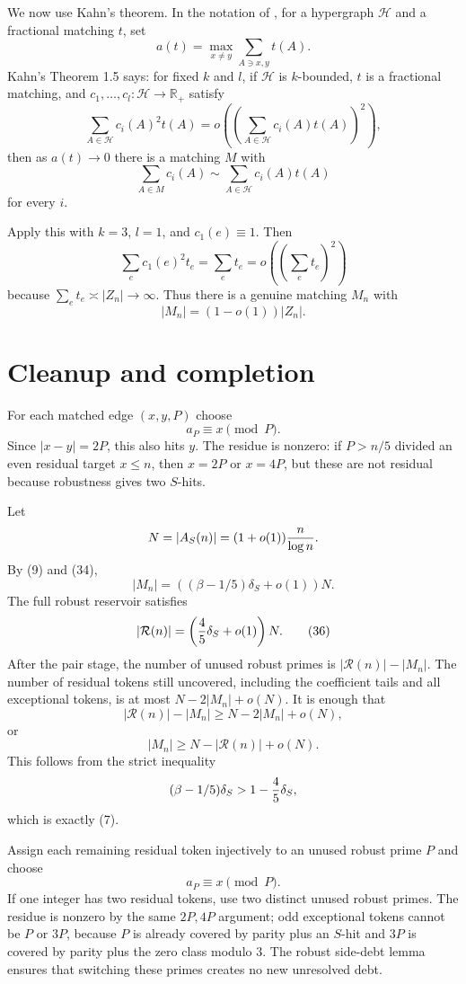 \documentclass[11pt]{article}
\newcommand{\R}{\mathcal R}
\begin{document}
We now use Kahn's theorem.  In the notation of \cite{Kahn1996}, for a hypergraph
$\mathcal H$ and a fractional matching $t$, set
\[
  a(t)=\max_{x\ne y}\sum_{A\ni x,y}t(A).                  \tag{32}
\]
Kahn's Theorem 1.5 says: for fixed $k$ and $l$, if $\mathcal H$ is $k$-bounded,
$t$ is a fractional matching, and $c_1,\ldots,c_l:\mathcal H\to\mathbb R_+$
satisfy
\[
  \sum_{A\in\mathcal H}c_i(A)^2t(A)
  =o\left(\left(\sum_{A\in\mathcal H}c_i(A)t(A)\right)^2\right),        \tag{33}
\]
then as $a(t)\to0$ there is a matching $M$ with
\[
  \sum_{A\in M}c_i(A)\sim\sum_{A\in\mathcal H}c_i(A)t(A)
\]
for every $i$.

Apply this with $k=3$, $l=1$, and $c_1(e)\equiv1$.  Then
\[
  \sum_e c_1(e)^2t_e=\sum_e t_e=o\left((\sum_e t_e)^2\right)
\]
because $\sum_e t_e\asymp |Z_n|\to\infty$.  Thus there is a genuine matching
$M_n$ with
\[
  |M_n|=(1-o(1))|Z_n|.                                   \tag{34}
\]

\section{Cleanup and completion}

For each matched edge $(x,y,P)$ choose
\[
  a_P\equiv x\pmod P.
\]
Since $|x-y|=2P$, this also hits $y$.  The residue is nonzero: if $P>n/5$
divided an even residual target $x\le n$, then $x=2P$ or $x=4P$, but these are
not residual because robustness gives two $S$-hits.

Let
\[
  N=|A_S(n)|=(1+o(1)){n\over\log n}.
\]
By (9) and (34),
\[
  |M_n|=\left((\beta-1/5)\delta_S+o(1)\right)N.           \tag{35}
\]
The full robust reservoir satisfies
\[
  |\R(n)|=\left({4\over5}\delta_S+o(1)\right)N.           \tag{36}
\]
After the pair stage, the number of unused robust primes is
$|\R(n)|-|M_n|$.  The number of residual tokens still uncovered, including the
coefficient tails and all exceptional tokens, is at most $N-2|M_n|+o(N)$.
It is enough that
\[
  |\R(n)|-|M_n|\ge N-2|M_n|+o(N),
\]
or
\[
  |M_n|\ge N-|\R(n)|+o(N).                               \tag{37}
\]
This follows from the strict inequality
\[
  (\beta-1/5)\delta_S>1-{4\over5}\delta_S,
\]
which is exactly (7).

Assign each remaining residual token injectively to an unused robust prime
$P$ and choose
\[
  a_P\equiv x\pmod P.
\]
If one integer has two residual tokens, use two distinct unused robust primes.
The residue is nonzero by the same $2P,4P$ argument; odd exceptional tokens
cannot be $P$ or $3P$, because $P$ is already covered by parity plus an $S$-hit
and $3P$ is covered by parity plus the zero class modulo $3$.  The robust
side-debt lemma ensures that switching these primes creates no new unresolved
debt.
\end{document}
